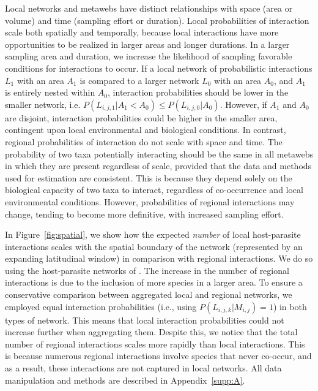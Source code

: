 \begin{box2.3}

Local networks and metawebs have distinct relationships with space (area or
volume) and time (sampling effort or duration). Local probabilities of
interaction scale both spatially and temporally, because local interactions
have more opportunities to be realized in larger areas and longer durations.
In a larger sampling area and duration, we increase the likelihood of sampling
favorable conditions for interactions to occur. If a local network of
probabilistic interactions $L_1$ with an area $A_1$ is compared to a larger
network $L_0$ with an area $A_0$, and $A_1$ is entirely nested within $A_0$,
interaction probabilities should be lower in the smaller network, i.e.
$P(L_{i,j,1} | A_1 < A_0) \le P(L_{i,j,0} | A_0)$. However, if $A_1$ and $A_0$
are disjoint, interaction probabilities could be higher in the smaller area,
contingent upon local environmental and biological conditions. In contrast,
regional probabilities of interaction do not scale with space and time. The
probability of two taxa potentially interacting should be the same in all
metawebs in which they are present regardless of scale, provided that the data
and methods used for estimation are consistent. This is because they depend
solely on the biological capacity of two taxa to interact, regardless of
co-occurrence and local environmental conditions. However, probabilities of
regional interactions may change, tending to become more definitive, with
increased sampling effort. 

In Figure~\ref{fig:spatial}, we show how the expected \textit{number} of local
host-parasite interactions scales with the spatial boundary of the network
(represented by an expanding latitudinal window) in comparison with regional
interactions. We do so using the host-parasite networks of
\textcite{Kopelke2017Foodweb}. The increase in the number of regional interactions
is due to the inclusion of more species in a larger area. To ensure a
conservative comparison between aggregated local and regional networks, we
employed equal interaction probabilities (i.e., using $P(L_{i, j,k}|M_{i, j}) =
1$) in both types of network. This means that local interaction probabilities
could not increase further when aggregating them. Despite this, we notice that
the total number of regional interactions scales more rapidly than local
interactions. This is because numerous regional interactions involve species
that never co-occur, and as a result, these interactions are not captured in
local networks. All data manipulation and methods are described in
Appendix~\ref{supp:A}.


\end{box2.3}
